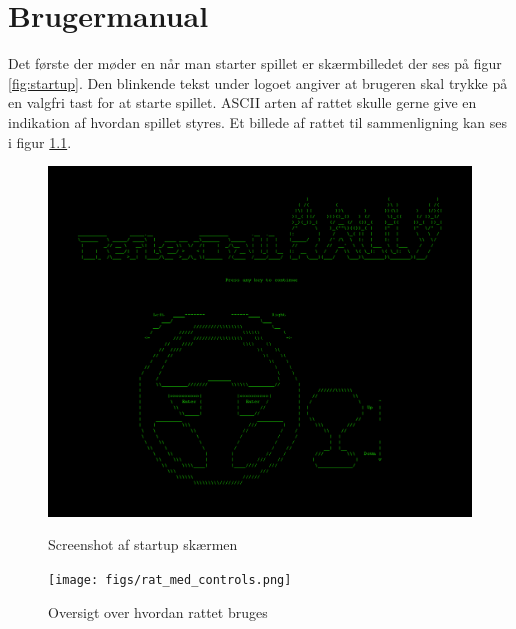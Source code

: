 \chapter{Brugermanual}

Det første der møder en når man starter spillet er skærmbilledet der ses på figur \ref{fig:startup}. Den blinkende tekst under logoet angiver at brugeren skal trykke på en valgfri tast for at starte spillet. ASCII arten af rattet skulle gerne give en indikation af hvordan spillet styres. Et billede af rattet til sammenligning kan ses i figur \ref{fig:rat_med_controls}.

\begin{figure}[ht]
\begin{minipage}[b]{0.5\linewidth}
\centering
\includegraphics[width=\textwidth]{figs/screenshots/startup_crop.png}
\caption{Screenshot af startup skærmen}
\label{fig:startup}
\end{minipage}
\hspace{0.5cm}
\begin{minipage}[b]{0.5\linewidth}
\centering
\texttt{[image: figs/rat\_med\_controls.png]}
\caption{Oversigt over hvordan rattet bruges}
\label{fig:rat_med_controls}
\end{minipage}
\end{figure}




